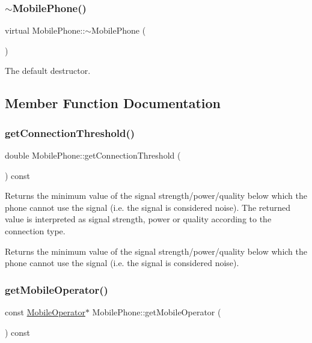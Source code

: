 \subsubsection{\texorpdfstring{$\sim$MobilePhone()}{~MobilePhone()}}
{\footnotesize\ttfamily virtual Mobile\+Phone\+::$\sim$\+Mobile\+Phone (\begin{DoxyParamCaption}{ }\end{DoxyParamCaption})\hspace{0.3cm}{\ttfamily [virtual]}}

The default destructor. 

\subsection{Member Function Documentation}
\mbox{\label{class_mobile_phone_a57475711a8f85086f50067d219f1181d}} 
\subsubsection{\texorpdfstring{getConnectionThreshold()}{getConnectionThreshold()}}
{\footnotesize\ttfamily double Mobile\+Phone\+::get\+Connection\+Threshold (\begin{DoxyParamCaption}{ }\end{DoxyParamCaption}) const}

Returns the minimum value of the signal strength/power/quality below which the phone cannot use the signal (i.\+e. the signal is considered noise). The returned value is interpreted as signal strength, power or quality according to the connection type. \begin{DoxyReturn}{Returns}
the minimum value of the signal strength/power/quality below which the phone cannot use the signal (i.\+e. the signal is considered noise). 
\end{DoxyReturn}
\mbox{\label{class_mobile_phone_aba72025d08c382d8533e0cbb9166999b}} 
\subsubsection{\texorpdfstring{getMobileOperator()}{getMobileOperator()}}
{\footnotesize\ttfamily const \mbox{\hyperlink{class_mobile_operator}{Mobile\+Operator}}$\ast$ Mobile\+Phone\+::get\+Mobile\+Operator (\begin{DoxyParamCaption}{ }\end{DoxyParamCaption}) const}


